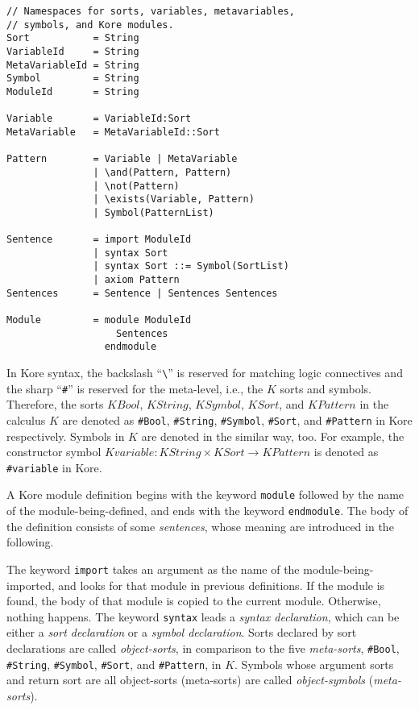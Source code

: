 \documentclass[UTF8]{article}
\theoremstyle{plain}
\theoremstyle{definition}
\theoremstyle{remark}
\newcommand{\KBool}{\mathit{KBool}}
\newcommand{\KString}{\mathit{KString}}
\newcommand{\KSort}{\mathit{KSort}}
\newcommand{\KSymbol}{\mathit{KSymbol}}
\newcommand{\KPattern}{\mathit{KPattern}}
\newcommand{\Kvariable}{\mathit{Kvariable}}
\begin{document}
\begin{Verbatim}[fontsize=\small]
// Namespaces for sorts, variables, metavariables,
// symbols, and Kore modules.
Sort           = String
VariableId     = String
MetaVariableId = String
Symbol         = String
ModuleId       = String

Variable       = VariableId:Sort
MetaVariable   = MetaVariableId::Sort

Pattern        = Variable | MetaVariable
               | \and(Pattern, Pattern)
               | \not(Pattern)
               | \exists(Variable, Pattern)
               | Symbol(PatternList)

Sentence       = import ModuleId
               | syntax Sort
               | syntax Sort ::= Symbol(SortList)
               | axiom Pattern
Sentences      = Sentence | Sentences Sentences

Module         = module ModuleId
                   Sentences
                 endmodule
\end{Verbatim}

In Kore syntax, the backslash ``\verb|\|'' is reserved for matching logic connectives and the sharp ``\verb|#|'' is reserved for the meta-level, i.e., the $K$ sorts and symbols. 
Therefore, the sorts $\KBool$, $\KString$, $\KSymbol$, $\KSort$, and 
$\KPattern$ in the calculus $K$ are denoted as \verb|#Bool|, \verb|#String|, 
\verb|#Symbol|, \verb|#Sort|, and \verb|#Pattern| in Kore respectively.
Symbols in $K$ are denoted in the similar way, too. 
For example, the constructor symbol $\Kvariable \colon \KString \times \KSort \to \KPattern$ is denoted as \verb|#variable| in Kore. 

A Kore module definition begins with the keyword \verb|module| followed by the name of the module-being-defined, and ends with the keyword \verb|endmodule|. The body of the definition consists of some \emph{sentences}, whose meaning are introduced in the following.

The keyword \verb|import| takes an argument as the name of the module-being-imported, and looks for that module in previous definitions. 
If the module is found, the body of that module is copied to the current module.
Otherwise, nothing happens. 
The keyword \verb|syntax| leads a \emph{syntax declaration}, which can be either a \emph{sort declaration} or a \emph{symbol declaration}.
Sorts declared by sort declarations are called \emph{object-sorts}, in comparison to the five \emph{meta-sorts}, \verb|#Bool|, \verb|#String|, \verb|#Symbol|, \verb|#Sort|, and \verb|#Pattern|, in $K$. 
Symbols whose argument sorts and return sort are all object-sorts (meta-sorts) are called \emph{object-symbols} (\emph{meta-sorts}).
\end{document}

